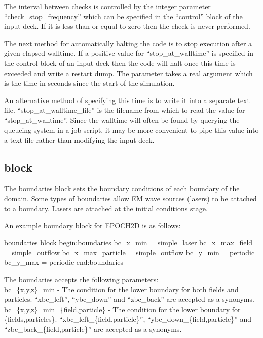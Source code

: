 The interval between checks is controlled by the integer parameter
``check\_stop\_frequency'' which can be specified in the ``control''
block of the input deck. If it is less than or equal to zero then
the check is never performed.

The next method for automatically halting the code is to stop execution after
a given elapsed walltime.
If a positive value for ``stop\_at\_walltime'' is specified in the
control block of an input deck then the code will halt once this
time is exceeded and write a restart dump. The parameter takes a real
argument which is the time in seconds since the start of the simulation.

An alternative method of specifying this time is to write it into a separate
text file. ``stop\_at\_walltime\_file'' is the filename from which to read the
value for ``stop\_at\_walltime''. Since the walltime will often be
found by querying the queueing system in a job script, it may be
more convenient to pipe this value into a text file rather than
modifying the input deck.


\subsection{ block}
\label{sec:boundaries_block}
The {\emphtext boundaries} block sets the boundary conditions of each boundary
of the domain. Some types of boundaries allow EM wave sources (lasers) to be
attached to a boundary. Lasers are attached at the initial conditions
stage.

An example boundary block for EPOCH2D is as follows:
\begin{lboxverbatim}{boundaries block}
begin:boundaries
   bc_x_min = simple_laser
   bc_x_max_field = simple_outflow
   bc_x_max_particle = simple_outflow
   bc_y_min = periodic
   bc_y_max = periodic
end:boundaries
\end{lboxverbatim}

The {\emphtext boundaries} accepts the following parameters:\\

{\emphtext bc\_\{x,y,z\}\_min} - The condition for the lower boundary for both
fields and particles. ``xbc\_left'', ``ybc\_down'' and ``zbc\_back'' are
accepted as a synonyms.\\

{\emphtext bc\_\{x,y,z\}\_min\_\{field,particle\}} - The condition for the lower
boundary for \{fields,particles\}. ``xbc\_left\_\{field,particle\}'',
``ybc\_down\_\{field,particle\}'' and ``zbc\_back\_\{field,particle\}'' are
accepted as a synonyms.\\

